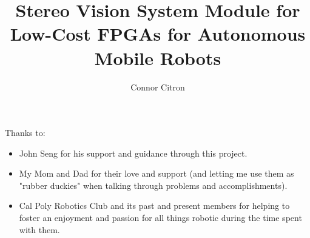 \documentclass[12pt]{ucthesis}
\begin{document}

\title{Stereo Vision System Module for Low-Cost FPGAs for Autonomous Mobile Robots}
\author{Connor Citron}
  
 
     

\maketitle

\begin{frontmatter}

\copyrightpage

\committeemembershippage

\begin{abstract}



\end{abstract}

\begin{acknowledgements}

Thanks to:
\begin{itemize}
	\item John Seng for his support and guidance through this project.
	\item My Mom and Dad for their love and support (and letting me use them as "rubber duckies" when talking through problems and accomplishments).
	\item Cal Poly Robotics Club and its past and present members for helping to foster an enjoyment and passion for all things robotic during the time spent with them.
\end{itemize}

\end{acknowledgements}

\tableofcontents

\listoftables

\listoffigures

\end{frontmatter}
\end{document}
